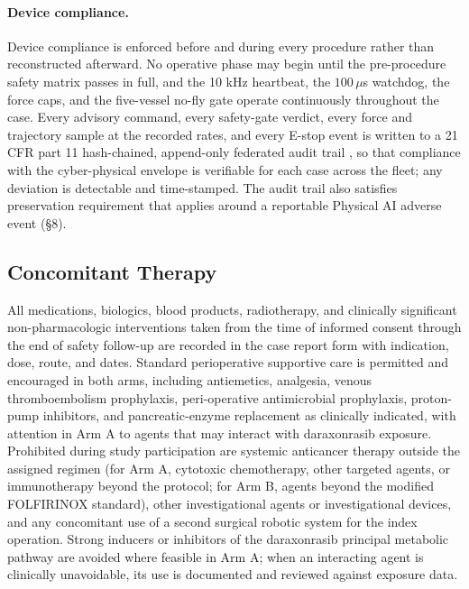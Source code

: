 \paragraph{Device compliance.}
Device compliance is enforced before and during every procedure rather than
reconstructed afterward. No operative phase may begin until the pre-procedure safety
matrix passes in full, and the 10 kHz heartbeat, the $100\,\mu$s watchdog, the force
caps, and the five-vessel no-fly gate operate continuously throughout the case. Every
advisory command, every safety-gate verdict, every force and trajectory sample at the
recorded rates, and every E-stop event is written to a 21 CFR part 11 hash-chained,
append-only federated audit trail \cite{ecfr2026part11}, so that compliance with the
cyber-physical envelope is verifiable for each case across the fleet; any deviation is
detectable and time-stamped. The audit trail also satisfies preservation
requirement that applies around a reportable Physical AI adverse event (\S8).

\clearpage

\subsection{Concomitant Therapy}

All medications, biologics, blood products, radiotherapy, and clinically significant
non-pharmacologic interventions taken from the time of informed consent through the
end of safety follow-up are recorded in the case report form with indication, dose,
route, and dates. Standard perioperative supportive care is permitted and encouraged
in both arms, including antiemetics, analgesia, venous thromboembolism prophylaxis,
peri-operative antimicrobial prophylaxis, proton-pump inhibitors, and
pancreatic-enzyme replacement as clinically indicated, with attention in Arm A to
agents that may interact with daraxonrasib exposure. Prohibited during study
participation are systemic anticancer therapy outside the assigned regimen (for
Arm A, cytotoxic chemotherapy, other targeted agents, or immunotherapy beyond the
protocol; for Arm B, agents beyond the modified FOLFIRINOX standard), other
investigational agents or investigational devices, and any concomitant use of a
second surgical robotic system for the index operation. Strong inducers or inhibitors
of the daraxonrasib principal metabolic pathway are avoided where feasible in Arm A;
when an interacting agent is clinically unavoidable, its use is documented and
reviewed against exposure data.

